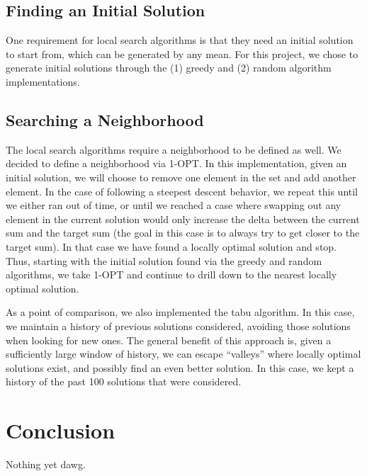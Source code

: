 \documentclass{report}
\begin{document}
\section{Finding an Initial Solution}
One requirement for local search algorithms is that they need an initial solution to start from, which
can be generated by any mean. For this project, we chose to generate initial
solutions through the (1) greedy and (2) random algorithm implementations.

\section{Searching a Neighborhood}
The local search algorithms require a neighborhood to be defined as well. We decided to define a neighborhood
via 1-OPT. In this implementation, given an initial solution, we will choose to remove one element in the set
and add another element. In the case of following a steepest descent behavior, we repeat this until we
either ran out of time, or until we reached a case where swapping out any element in the current solution
would only increase the delta between the current sum and the target sum (the goal in this case is to always try to
get closer to the target sum). In that case we have found a locally
optimal solution and stop. Thus, starting with the initial solution found via the greedy and random
algorithms, we take 1-OPT and continue to drill down to the nearest locally optimal solution.

As a point of comparison, we also implemented the tabu algorithm. In this case, we maintain a history
of previous solutions considered, avoiding those solutions when looking for new ones. The general
benefit of this approach is, given a sufficiently large window of history, we can escape ``valleys''
where locally optimal solutions exist, and possibly find an even better solution. In this case,
we kept a history of the past 100 solutions that were considered.

\chapter{Conclusion}
Nothing yet dawg.



\end{document}

